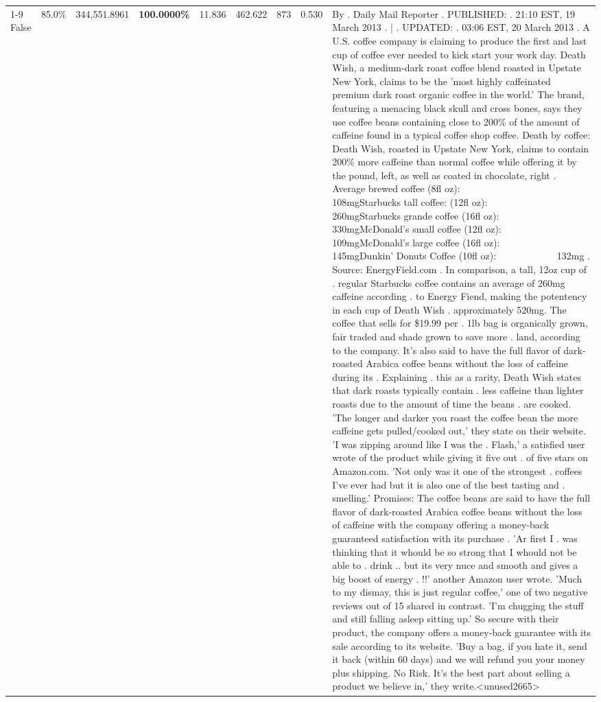 \begin{table}[H]
{\begin{tabular}{lllrlllll}
\cline{1-9}
False & 85.0\% & 344,551.8961 & \bfseries \color{red} 100.0000\% & 11.836 & 462.622 & 873 & 0.530 & By . Daily Mail Reporter . PUBLISHED: . 21:10 EST, 19 March 2013 . | . UPDATED: . 03:06 EST, 20 March 2013 . A U.S. coffee company is claiming to produce the first and last cup of coffee ever needed to kick start your work day. Death Wish, a medium-dark roast coffee blend roasted in Upstate New York, claims to be the 'most highly caffeinated premium dark roast organic coffee in the world.' The brand, featuring a menacing black skull and cross bones, says they use coffee beans containing close to 200\% of the amount of caffeine found in a typical coffee shop coffee. Death by coffee: Death Wish, roasted in Upstate New York, claims to contain 200\% more caffeine than normal coffee while offering it by the pound, left, as well as coated in chocolate, right . Average brewed coffee (8fl oz):              108mgStarbucks tall coffee: (12fl oz):                260mgStarbucks grande coffee (16fl oz):         330mgMcDonald's small coffee (12fl oz):           109mgMcDonald's large coffee (16fl oz):           145mgDunkin' Donuts Coffee (10fl oz):             132mg . Source: EnergyField.com . In comparison, a tall, 12oz cup of . regular Starbucks coffee contains an average of 260mg caffeine according . to Energy Fiend, making the potentency in each cup of Death Wish . approximately 520mg. The coffee that sells for \$19.99 per . 1lb bag is organically grown, fair traded and shade grown to save more . land, according to the company. It's also said to have the full flavor of dark-roasted Arabica coffee beans without the loss of caffeine during its . Explaining . this as a rarity, Death Wish states that dark roasts typically contain . less caffeine than lighter roasts due to the amount of time the beans . are cooked. 'The longer and darker you roast the coffee bean the more caffeine gets pulled/cooked out,' they state on their website. 'I was zipping around like I was the . Flash,' a satisfied user wrote of the product while giving it five out . of five stars on Amazon.com. 'Not only was it one of the strongest . coffees I've ever had but it is also one of the best tasting and . smelling.’ Promises: The coffee beans are said to have the full flavor of dark-roasted Arabica coffee beans without the loss of caffeine with the company offering a money-back guaranteed satisfaction with its purchase . 'Ar first I . was thinking that it whould be so strong that I whould not be able to . drink .. but its very nuce and smooth and gives a big boost of energy . !!' another Amazon user wrote. 'Much to my dismay, this is just regular coffee,' one of two negative reviews out of 15 shared in contrast. 'I'm chugging the stuff and still falling asleep sitting up.' So secure with their product, the company offers a money-back guarantee with its sale according to its website. 'Buy a bag, if you hate it, send it back (within 60 days) and we will refund you your money plus shipping. No Risk. It’s the best part about selling a product we believe in,' they write.<unused2665> \\

\end{tabular}}
\end{table}
